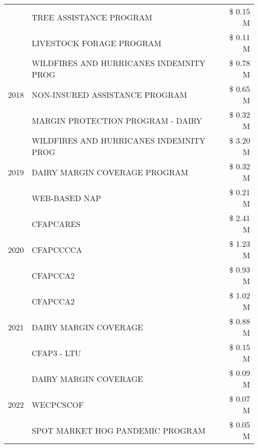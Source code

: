 \begin{tabular}{llr}
 & TREE ASSISTANCE PROGRAM & \$ 0.15 M \\
 & LIVESTOCK FORAGE PROGRAM & \$ 0.11 M \\
\cline{1-3}
\multirow[t]{3}{*}{2018} & WILDFIRES AND HURRICANES INDEMNITY PROG & \$ 0.78 M \\
 & NON-INSURED ASSISTANCE PROGRAM & \$ 0.65 M \\
 & MARGIN PROTECTION PROGRAM - DAIRY & \$ 0.32 M \\
\cline{1-3}
\multirow[t]{3}{*}{2019} & WILDFIRES AND HURRICANES INDEMNITY PROG & \$ 3.20 M \\
 & DAIRY MARGIN COVERAGE PROGRAM & \$ 0.32 M \\
 & WEB-BASED NAP & \$ 0.21 M \\
\cline{1-3}
\multirow[t]{3}{*}{2020} & CFAPCARES & \$ 2.41 M \\
 & CFAPCCCCA & \$ 1.23 M \\
 & CFAPCCA2 & \$ 0.93 M \\
\cline{1-3}
\multirow[t]{3}{*}{2021} & CFAPCCA2 & \$ 1.02 M \\
 & DAIRY MARGIN COVERAGE & \$ 0.88 M \\
 & CFAP3 - LTU & \$ 0.15 M \\
\cline{1-3}
\multirow[t]{3}{*}{2022} & DAIRY MARGIN COVERAGE & \$ 0.09 M \\
 & WECPCSCOF & \$ 0.07 M \\
 & SPOT MARKET HOG PANDEMIC PROGRAM & \$ 0.05 M \\
\cline{1-3}
\bottomrule
\end{tabular}
